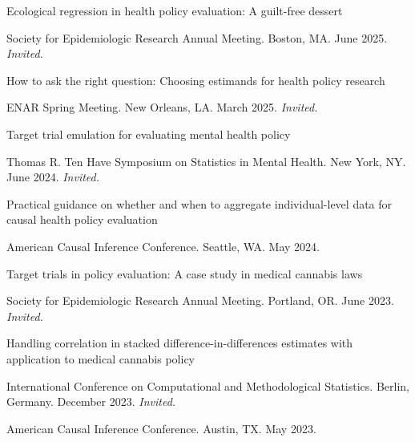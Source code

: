 \documentclass[letterpaper,11pt]{article} %
\begin{document}
	\begin{etaremune}
            \item Ecological regression in health policy evaluation: A guilt-free dessert
            \begin{conflist}
                \item Society for Epidemiologic Research Annual Meeting. Boston, MA. June 2025. \textit{Invited.}
            \end{conflist}
            \item How to ask the right question: Choosing estimands for health policy research
            \begin{conflist}
                \item ENAR Spring Meeting. New Orleans, LA. March 2025. \textit{Invited.}
            \end{conflist}
            \item Target trial emulation for evaluating mental health policy
            \begin{conflist}
                \item Thomas R. Ten Have Symposium on Statistics in Mental Health. New York, NY. June 2024. \textit{Invited.}
            \end{conflist}
            \item Practical guidance on whether and when to aggregate individual-level data for causal health policy evaluation
            \begin{conflist}
                \item American Causal Inference Conference. Seattle, WA. May 2024.
            \end{conflist}
		\item Target trials in policy evaluation: A case study in medical cannabis laws
		\begin{conflist}
			\item Society for Epidemiologic Research Annual Meeting. Portland, OR. June 2023. \textit{Invited.}
		\end{conflist}
		\item Handling correlation in stacked difference-in-differences estimates with application to medical cannabis policy
		\begin{conflist}
			\item International Conference on Computational and Methodological Statistics. Berlin, Germany. December 2023. \textit{Invited.}
			\item American Causal Inference Conference. Austin, TX. May 2023.

\end{conflist}
\end{etaremune}
\end{document}
